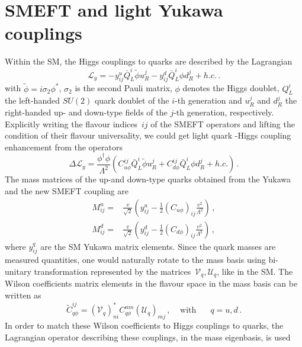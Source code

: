 \section{SMEFT and light Yukawa couplings\label{sec:EFTlightyuk}}
\par Within the SM, the Higgs couplings to quarks are described by the Lagrangian
\begin{equation}
	\mathcal{L}_{y}=-y^u_{ij} \bar{Q}_L^i \tilde{\phi} u_R^j - y^d_{ij} \bar{Q}_L^i \phi d_R^j +h.c.\,.
\end{equation}
with $\tilde{\phi}=i \sigma_2 \phi^*$, $\sigma_2$ is the second Pauli matrix, $\phi$ denotes the Higgs doublet, $Q_L^i$ the left-handed $SU(2)$ quark doublet of the $i$-th generation and $u_R^j$ and $d_R^j$ the right-handed up- and down-type fields of the $j$-th generation, respectively.
Explicitly writing the flavour indices~$ij$ of the SMEFT operators and lifting the condition of their flavour universality, we could get light quark -Higgs coupling enhancement from the operators
\begin{equation}
	\Delta \mathcal{L}_{y}=\frac{\phi^{\dagger}\phi}{\Lambda^2}\left( C_{u \phi}^{ij} \bar{Q}_L^i \tilde{\phi} u_R^j + C_{d \phi}^{ij} \bar{Q}_L^i \phi d_R^j +h.c.\right)\,.
	\label{eq:EFTop}
\end{equation}
The mass matrices of the up-and down-type quarks obtained from the Yukawa and the new SMEFT coupling are
%
\begin{align}
	M^u_{ij} =& \frac{v}{\sqrt{2}} \left( y^u_{ij}-\frac{1}{2} (C_{u\phi})_{ij}\frac{v^2}{\Lambda^2}\right)\,,\nonumber\\
	M^d_{ij} =& \frac{v}{\sqrt{2}} \left( y^d_{ij}-\frac{1}{2} (C_{d\phi})_{ij}\frac{v^2}{\Lambda^2}\right)\,, \label{eq:mass}
\end{align}
where $y^q_{ij}$ are the SM Yukawa matrix elements. Since the quark masses are measured quantities, one would naturally rotate to the mass basis using bi-unitary transformation represented by the matrices~$ \mathcal{V}_q, \mathcal{U}_q$, like in the SM. The Wilson coefficients matrix elements in the flavour space in the mass basis can be written as
\begin{equation}
	\tilde{C}_{q \phi}^{ij}= \left(\mathcal{V}_{q}\right)^*_{ni}C^{nm}_{q\phi}\left( \mathcal U_{q}\right)_{mj}\, , \; \; \; \;  \text{with } \;\;\;\;\; q = u,d\, .
\end{equation}
In order to match these Wilson coefficients to Higgs couplings to quarks,  the Lagrangian operator describing these couplings, in the mass eigenbasis, is used
